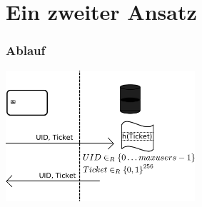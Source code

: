 \section{Ein zweiter Ansatz}

\begin{frame}
	\frametitle{Ablauf}
	\includegraphics[width=7cm]{ansatz2ablauf.png}
\end{frame}



